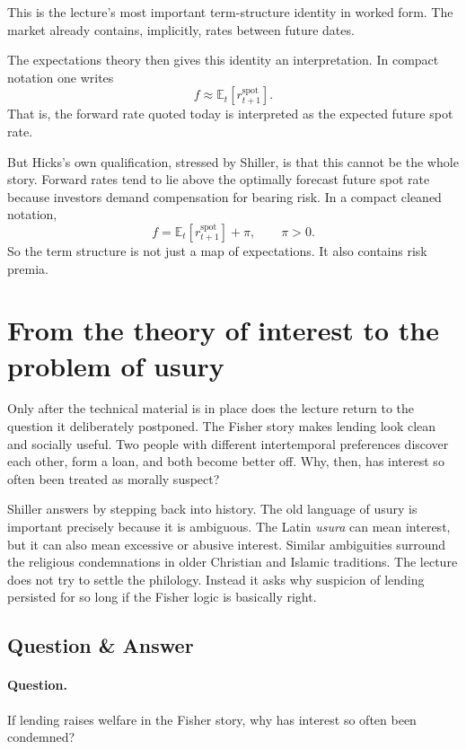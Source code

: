 This is the lecture's most important term-structure identity in worked form. The market already contains, implicitly, rates between future dates.

The expectations theory then gives this identity an interpretation. In compact notation one writes
\begin{equation}
f \approx \mathbb{E}_t\!\left[r^{\text{spot}}_{t+1}\right].
\end{equation}
That is, the forward rate quoted today is interpreted as the expected future spot rate.

But Hicks's own qualification, stressed by Shiller, is that this cannot be the whole story. Forward rates tend to lie above the optimally forecast future spot rate because investors demand compensation for bearing risk. In a compact cleaned notation,
\begin{equation}
f=\mathbb{E}_t\!\left[r^{\text{spot}}_{t+1}\right]+\pi,
\qquad
\pi>0.
\end{equation}
So the term structure is not just a map of expectations. It also contains risk premia.

\section{From the theory of interest to the problem of usury}

Only after the technical material is in place does the lecture return to the question it deliberately postponed. The Fisher story makes lending look clean and socially useful. Two people with different intertemporal preferences discover each other, form a loan, and both become better off. Why, then, has interest so often been treated as morally suspect?

Shiller answers by stepping back into history. The old language of usury is important precisely because it is ambiguous. The Latin \emph{usura} can mean interest, but it can also mean excessive or abusive interest. Similar ambiguities surround the religious condemnations in older Christian and Islamic traditions. The lecture does not try to settle the philology. Instead it asks why suspicion of lending persisted for so long if the Fisher logic is basically right.

\subsection{Question \& Answer}

\paragraph{Question.} If lending raises welfare in the Fisher story, why has interest so often been condemned?

